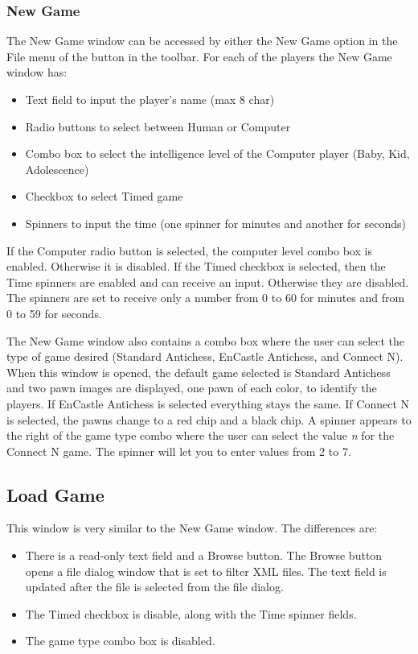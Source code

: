 \documentclass{report}
\begin{document}
		\subsubsection{New Game}
			The New Game window can be accessed by either the New Game option in 
			the File menu of the button in the toolbar. For each of the players
			the New Game window has:
			\begin{itemize}
					\item Text field to input the player's name (max 8 char)
					\item Radio buttons to select between Human or Computer
					\item Combo box to select the intelligence level of the Computer
								player (Baby, Kid, Adolescence)
					\item Checkbox to select Timed game 
					\item Spinners to input the time (one spinner for minutes and 
								another for seconds)
				\end{itemize}
			If the Computer radio button is selected, the computer level combo box is enabled.
			Otherwise it is disabled. If the Timed checkbox is selected, then the 
			Time spinners are enabled and can receive an input. Otherwise they 
			are disabled. The spinners are set to receive only a number from 0 to 60 for 
			minutes and from 0 to 59 for seconds.
			
			The New Game window also contains a combo box where the user can select the 
			type of game desired (Standard Antichess, EnCastle Antichess, and Connect N).
			When this window is opened, the default game selected is Standard Antichess and
			two pawn images are displayed, one pawn of each color, to identify the players. 
			If EnCastle Antichess is selected everything stays the same. If Connect N is 
			selected, the pawns change to a red chip and a black chip. A spinner appears to
			the right of the game type combo where the user can select the value \textsl{n} 
			for the Connect N game. The spinner will let you to enter values from 2 to 7.
			
			\subsection{Load Game}
			
			This window is very similar to the New Game window. The differences are:
				\begin{itemize}
					\item There is a read-only text field and a Browse button. The Browse
								button opens a file dialog window that is set to filter XML files.
								The text field is updated after the file is selected from the file
								dialog. 
					\item The Timed checkbox is disable, along with the Time spinner fields.
					\item The game type combo box is disabled.
				\end{itemize}
				
\end{document}
